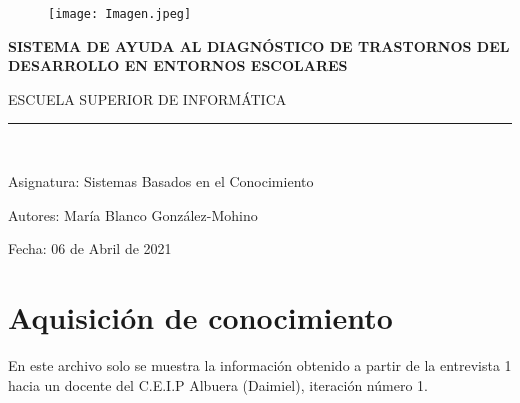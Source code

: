 \documentclass[letterpaper,12pt]{article}
\begin{document}
	
	\begin{titlepage}
		
		\begin{center}
			\vspace*{-1in}
			\begin{figure}[htb]
				\begin{center}
					\texttt{[image: Imagen.jpeg]}
				\end{center}
			\end{figure}
		
			\vspace*{0.15in}
			\begin{Large}
				\begin{center}
					\textbf{SISTEMA DE AYUDA AL DIAGNÓSTICO DE
TRASTORNOS DEL DESARROLLO EN
ENTORNOS ESCOLARES}
				\end{center}
			\end{Large}
			\vspace*{0.3in}
			\begin{large}
				ESCUELA SUPERIOR DE INFORMÁTICA\\
			\end{large}
			\vspace*{0.3in}
			\rule{150mm}{0.1mm}\\
			\vspace*{0.6in}
			\begin{large}
				\begin{flushleft}
					{\normalsize Asignatura: Sistemas Basados en el Conocimiento}
				\end{flushleft}
				\begin{flushleft}
					{\normalsize Autores: María Blanco González-Mohino\\} 
				\end{flushleft}
				\begin{flushleft}
					{\normalsize Fecha: 06 de Abril de 2021}
				\end{flushleft}
			\end{large}
		\end{center}
		\end{titlepage}
		\tableofcontents
		\newpage

\section{Aquisición de conocimiento}
	En este archivo solo se muestra la información obtenido a partir de la entrevista 1 hacia un docente del C.E.I.P Albuera (Daimiel), iteración número 1.
	
\end{document}
